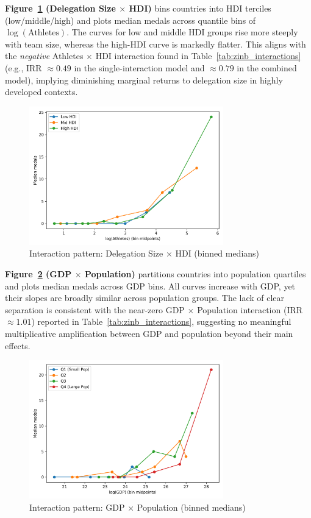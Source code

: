 \documentclass[11pt,twoside]{article}
\numberwithin{Theorem}{section}
\numberwithin{Definition}{section}
\numberwithin{Lemma}{section}
\numberwithin{Algorithm}{section}
\numberwithin{equation}{section}
\begin{document}
\textbf{Figure~\ref{fig:ath_hdi} (Delegation Size $\times$ HDI)} bins countries into HDI terciles (low/middle/high) and plots median medals across quantile bins of $\log(\text{Athletes})$. The curves for low and middle HDI groups rise more steeply with team size, whereas the high-HDI curve is markedly flatter. This aligns with the \emph{negative} Athletes $\times$ HDI interaction found in Table~\ref{tab:zinb_interactions} (e.g., IRR $\approx 0.49$ in the single-interaction model and $\approx 0.79$ in the combined model), implying diminishing marginal returns to delegation size in highly developed contexts.

\begin{figure}[H]
  \centering
  \includegraphics[width=0.75\textwidth]{fig_interaction_athletes_hdi.png}
  \caption{Interaction pattern: Delegation Size $\times$ HDI (binned medians)}
  \label{fig:ath_hdi}
\end{figure}


\textbf{Figure~\ref{fig:gdp_pop} (GDP $\times$ Population)} partitions countries into population quartiles and plots median medals across GDP bins. All curves increase with GDP, yet their slopes are broadly similar across population groups. The lack of clear separation is consistent with the near-zero GDP $\times$ Population interaction (IRR $\approx 1.01$) reported in Table~\ref{tab:zinb_interactions}, suggesting no meaningful multiplicative amplification between GDP and population beyond their main effects.

\begin{figure}[H]
  \centering
  \includegraphics[width=0.75\textwidth]{fig_interaction_gdp_pop.png}
  \caption{Interaction pattern: GDP $\times$ Population (binned medians)}
  \label{fig:gdp_pop}
\end{figure}
\end{document}
